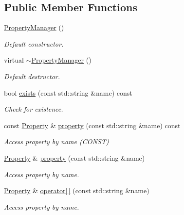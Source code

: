 \subsection*{Public Member Functions}
\begin{DoxyCompactItemize}
\item 
\hyperlink{class_d_d4hep_1_1_property_manager_a3b65b75bae28db832e98a38aec5774c6}{Property\+Manager} ()
\begin{DoxyCompactList}\small\item\em Default constructor. \end{DoxyCompactList}\item 
virtual \hyperlink{class_d_d4hep_1_1_property_manager_aa16d7f0cb2a2baaa3b3afbe6239aac39}{$\sim$\+Property\+Manager} ()
\begin{DoxyCompactList}\small\item\em Default destructor. \end{DoxyCompactList}\item 
bool \hyperlink{class_d_d4hep_1_1_property_manager_a5b298c29e29a1a40237a8e5906a22ba4}{exists} (const std\+::string \&name) const
\begin{DoxyCompactList}\small\item\em Check for existence. \end{DoxyCompactList}\item 
const \hyperlink{class_d_d4hep_1_1_property}{Property} \& \hyperlink{class_d_d4hep_1_1_property_manager_af0214bbdd3a5ffb94dcdbc9528295990}{property} (const std\+::string \&name) const
\begin{DoxyCompactList}\small\item\em Access property by name (C\+O\+N\+ST) \end{DoxyCompactList}\item 
\hyperlink{class_d_d4hep_1_1_property}{Property} \& \hyperlink{class_d_d4hep_1_1_property_manager_aed8bdf063671e03ed7f5ef066e3ea959}{property} (const std\+::string \&name)
\begin{DoxyCompactList}\small\item\em Access property by name. \end{DoxyCompactList}\item 
\hyperlink{class_d_d4hep_1_1_property}{Property} \& \hyperlink{class_d_d4hep_1_1_property_manager_a42780898d22a908befe48f8137f7321e}{operator\mbox{[}$\,$\mbox{]}} (const std\+::string \&name)
\begin{DoxyCompactList}\small\item\em Access property by name. \end{DoxyCompactList}\item 

\end{DoxyCompactItemize}
